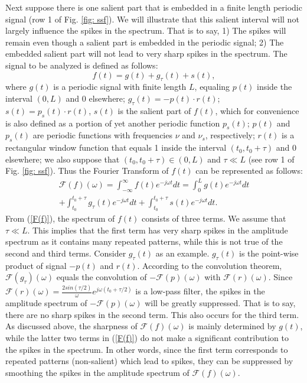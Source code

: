 \documentclass[10pt,journal,cspaper,compsoc]{IEEEtran}
\begin{document}
Next suppose there is one salient part that is embedded in a finite length periodic signal (row 1 of Fig. \ref{fig: ssf}). We will illustrate that this salient interval will not largely influence the spikes in the spectrum. That is to say, 1) The spikes will remain even though a salient part is embedded in the periodic signal; 2) The embedded salient part will not lead to very sharp spikes in the spectrum. The signal to be analyzed is defined as follows:
\begin{equation}
 f(t)=g(t)+g_\tau(t)+s(t), \label {equ15}
\end {equation}
where $g(t)$ is a periodic signal with finite length $L$, equaling $p(t)$ inside the interval $(0, L)$ and 0 elsewhere;
$g_\tau(t)=-p(t)\cdot {r}(t)$;
$s(t)=p_s(t)\cdot {r}(t)$,
$s(t)$ is the salient part of $f(t)$, which for convenience is also defined as a portion of yet another periodic function $p_s(t) $; $p(t)$ and $p_s(t) $ are periodic functions with frequencies $\nu$ and $\nu_s$, respectively; ${r}(t)$ is a rectangular window function that equals 1 inside the interval $(t_0,t_0+\tau)$ and 0 elsewhere; we also suppose that $(t_0,t_0+\tau)\in (0,L)$ and  $\tau \ll L$ (see row 1 of Fig. \ref{fig: ssf}). Thus the Fourier Transform of $f(t)$ can be represented as follows:
\begin{multline}
{\mathcal F}(f)(\omega)=\int_{-\infty}^{\infty}f(t)e^{-j\omega t}dt=
\int_{0}^{L}g(t)e^{-j\omega t}dt\\
+\int_{ t_0}^{ t_0+\tau}g_\tau(t)e^{-j\omega t}dt+\int_{ t_0}^{ t_0+\tau}s(t)e^{-j\omega t}dt\label{F(f)}.
\end{multline}
From (\ref{F(f)}), the spectrum of $f(t)$ consists of three terms. We assume that $\tau \ll L$. This implies that the first term has very sharp spikes in the amplitude spectrum as it contains many repeated patterns, while this is not true of the second and third terms. Consider $g_\tau(t)$ as an example. $g_\tau(t)$  is the point-wise product of signal $-p(t)$ and ${r}(t)$. According to the convolution theorem, ${\mathcal F}(g_\tau)(\omega)$ equals the convolution of $-{\mathcal F}(p)(\omega)$ with ${\mathcal F}(r)(\omega)$. Since ${\mathcal F}({r})(\omega)=\frac{2sin (\tau/2)}{\omega}e^{j\omega(t_0+\tau/2)}$ is a low-pass filter, the spikes in the amplitude spectrum of $-{\mathcal F}(p)(\omega)$ will be greatly suppressed. That is to say, there are no sharp spikes in the second term. This also occurs for the third term.
As discussed above, the sharpness of ${\mathcal F}(f)(\omega)$ is mainly determined by $g(t)$, while the latter two terms in (\ref{F(f)}) do not make a significant contribution to the spikes in the spectrum. In other words, since the first term corresponds to repeated patterns (non-salient) which lead to spikes, they can be suppressed by smoothing the spikes in the amplitude spectrum of ${\mathcal F}(f)(\omega)$.
\end{document}
